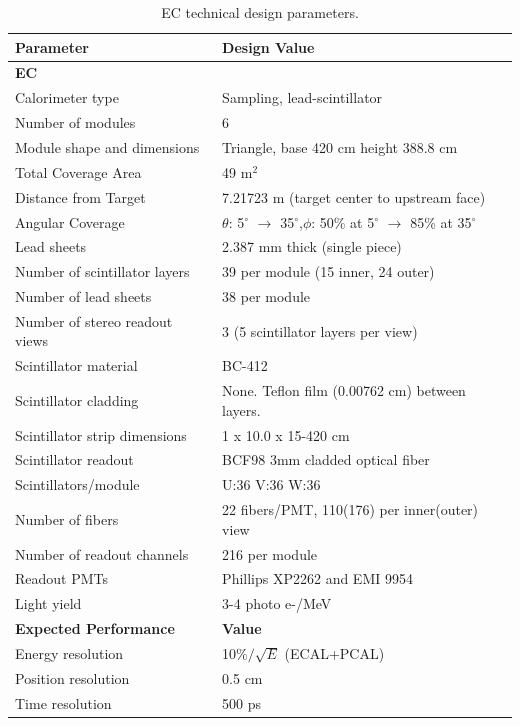\documentclass[letterpaper,10pt]{article}
\begin{document}
\begin{table}[htbp]
\begin{center}
\begin{tabular}{|l|l|} \hline
{\bf Parameter}        & {\bf Design Value} \\ \hline \hline
{\bf EC}         &              \\ \hline
Calorimeter type   & Sampling, lead-scintillator \\ \hline
Number of modules  & 6 \\ \hline
Module shape and dimensions & Triangle, base 420 cm height 388.8 cm \\ \hline
Total Coverage Area      & 49 m$^2$ \\ \hline
Distance from Target & 7.21723 m (target center to upstream face) \\ \hline
Angular Coverage   & $\theta$: 5$^\circ$ $\to$ 35$^\circ$,$\phi$: 50\% at 5$^\circ$ $\to$ 85\% at 35$^\circ$ \\ \hline
Lead sheets & 2.387 mm thick (single piece)\\ \hline
Number of scintillator layers & 39 per module (15 inner, 24 outer) \\ \hline
Number of lead sheets  & 38 per module \\ \hline
Number of stereo readout views & 3 (5 scintillator layers per view) \\ \hline
Scintillator material & BC-412\\ \hline
Scintillator cladding & None. Teflon film (0.00762 cm) between layers. \\ \hline
Scintillator strip dimensions & 1 x 10.0 x 15-420 cm \\ \hline
Scintillator readout & BCF98 3mm cladded optical fiber \\ \hline
Scintillators/module & U:36 V:36 W:36 \\ \hline
Number of fibers & 22 fibers/PMT, 110(176) per inner(outer) view \\ \hline
Number of readout channels & 216 per module \\ \hline
Readout PMTs & Phillips XP2262 and EMI 9954 \\ \hline
Light yield & 3-4 photo e-/MeV \\ \hline \hline
{\bf Expected Performance} & {\bf Value} \\ \hline
Energy resolution & 10$\%/\sqrt E$ (ECAL+PCAL) \\ \hline
Position resolution & 0.5 cm \\ \hline
Time resolution & 500 ps \\ \hline

\end{tabular}
\end{center}
\caption{EC technical design parameters.} 
\label{tab:ftofproperties}
\end{table}
\end{document}
